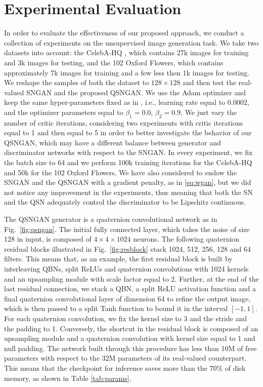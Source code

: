 \documentclass[graybox]{svmult}
\begin{document}
\section{Experimental Evaluation}
\label{sec:exp}
\noindent In order to evaluate the effectiveness of our proposed approach, we conduct a collection of experiments on the unsupervised image generation task. We take two datasets into account: the CelebA-HQ \cite{KarrasPG2018}, which contains 27k images for training and 3k images for testing, and the 102 Oxford Flowers, which contains approximately 7k images for training and a few less then 1k images for testing. We reshape the samples of both the dataset to $128 \times 128$ and then test the real-valued SNGAN and the proposed QSNGAN. We use the Adam optimizer and keep the same hyper-parameters fixed as in \cite{Miyato2018SpectralNF}, i.e., learning rate equal to $0.0002$, and the optimizer parameters equal to $\beta_1=0.0$, $\beta_2=0.9$. We just vary the number of critic iterations, considering two experiments with critic iterations equal to 1 and then equal to 5 in order to better investigate the behavior of our QSNGAN, which may have a different balance between generator and discriminator networks with respect to the SNGAN. In every experiment, we fix the batch size to 64 and we perform 100k training iterations for the CelebA-HQ and 50k for the 102 Oxford Flowers. We have also considered to endow the SNGAN and the QSNGAN with a gradient penalty, as in \eqref{eq:wgan}, but we did not notice any improvement in the experiments, thus meaning that both the SN and the QSN adequately control the discriminator to be Lipschitz continuous.

The QSNGAN generator is a quaternion convolutional network as in Fig.~\ref{fig:qsngan}. The initial fully connected layer, which takes the noise of size 128 in input, is composed of $4 \times 4 \times 1024$ neurons. The following quaternion residual blocks illustrated in Fig.~\ref{fig:resblock} stack 1024, 512, 256, 128 and 64 filters. This means that, as an example, the first residual block is built by interleaving QBNs, split ReLUs and quaternion convolutions with 1024 kernels and an upsampling module with scale factor equal to 2. Further, at the end of the last residual connection, we stack a QBN, a split ReLU activation function and a final quaternion convolutional layer of dimension 64 to refine the output image, which is then passed to a split Tanh function to bound it in the interval $[-1, 1]$. For each quaternion convolution, we fix the kernel size to 3 and the stride and the padding to 1. Conversely, the shortcut in the residual block is composed of an upsampling module and a quaternion convolution with kernel size equal to 1 and null padding. The network built through this procedure has less than 10M of free parameters with respect to the 32M parameters of its real-valued counterpart. This means that the checkpoint for inference saves more than the $70\%$ of disk memory, as shown in Table \ref{tab:params}.
\end{document}
